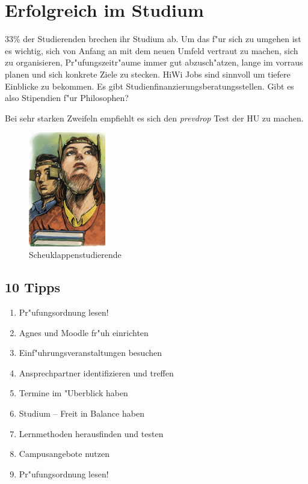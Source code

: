 \documentclass[]{scrartcl}
\begin{document}
\newpage


\section{Erfolgreich im Studium}

33\% der Studierenden brechen ihr Studium ab. Um das f"ur sich zu umgehen ist es wichtig, sich von Anfang an mit dem neuen Umfeld vertraut zu machen, sich zu organisieren, Pr"ufungszeitr"aume immer gut abzusch"atzen, lange im vorraus planen und sich konkrete Ziele zu stecken. HiWi Jobs sind sinnvoll um tiefere Einblicke zu bekommen. Es gibt Studienfinanzierungsberatungsstellen. Gibt es also Stipendien f"ur Philosophen?

Bei sehr starken Zweifeln empfiehlt es sich den \emph{prevdrop} Test der HU zu machen.

\begin{figure}[h]
	\centering
	\includegraphics[width=0.3\textwidth]{images/studienorga/scheu.jpg}
	\caption{Scheuklappenstudierende}
	\label{fig:sess}
\end{figure}

\subsection{10 Tipps}

\begin{enumerate}
  \item Pr"ufungsordnung lesen!
  \item Agnes und Moodle fr"uh einrichten
  \item Einf"uhrungsveranstaltungen besuchen
  \item Ansprechpartner identifizieren und treffen
  \item Termine im "Uberblick haben
  \item Studium -- Freit in Balance haben
  \item Lernmethoden herausfinden und testen
  \item Campusangebote nutzen
  \item Pr"ufungsordnung lesen!
\end{enumerate}
\end{document}
